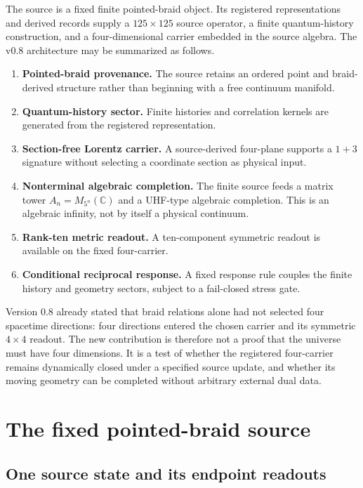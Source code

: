 \documentclass[12pt,a4paper,twoside]{article}
\begin{document}
The source is a fixed finite pointed-braid object. Its registered representations and derived records supply a $125\times125$ source operator, a finite quantum-history construction, and a four-dimensional carrier embedded in the source algebra. The v0.8 architecture may be summarized as follows.

\begin{enumerate}
  \item \textbf{Pointed-braid provenance.} The source retains an ordered point and braid-derived structure rather than beginning with a free continuum manifold.
  \item \textbf{Quantum-history sector.} Finite histories and correlation kernels are generated from the registered representation.
  \item \textbf{Section-free Lorentz carrier.} A source-derived four-plane supports a $1+3$ signature without selecting a coordinate section as physical input.
  \item \textbf{Nonterminal algebraic completion.} The finite source feeds a matrix tower $A_n=M_{5^n}(\mathbb{C})$ and a UHF-type algebraic completion. This is an algebraic infinity, not by itself a physical continuum.
  \item \textbf{Rank-ten metric readout.} A ten-component symmetric readout is available on the fixed four-carrier.
  \item \textbf{Conditional reciprocal response.} A fixed response rule couples the finite history and geometry sectors, subject to a fail-closed stress gate.
\end{enumerate}

Version 0.8 already stated that braid relations alone had not selected four spacetime directions: four directions entered the chosen carrier and its symmetric $4\times4$ readout. The new contribution is therefore not a proof that the universe must have four dimensions. It is a test of whether the registered four-carrier remains dynamically closed under a specified source update, and whether its moving geometry can be completed without arbitrary external dual data.

\section{The fixed pointed-braid source}

\subsection{One source state and its endpoint readouts}
\end{document}
